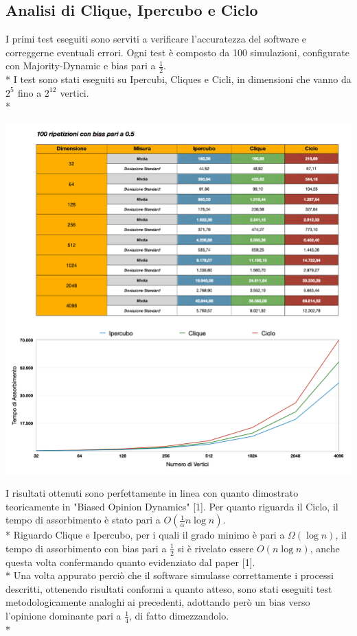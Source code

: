 \documentclass{article}
\begin{document}
\subsection{Analisi di Clique, Ipercubo e Ciclo}
I primi test eseguiti sono serviti a verificare l'accuratezza del software e correggerne eventuali errori. Ogni test è composto da 100 simulazioni, configurate con Majority-Dynamic e bias pari a $\frac{1}{2}$.\\*
I test sono stati eseguiti su Ipercubi, Cliques e Cicli, in dimensioni che vanno da $2^{5^{\mathrm{}}}$ fino a $2^{12^{\mathrm{}}}$ vertici.\\*
\begin{center}
\includegraphics[width=1\textwidth]{Test/test_bias05.png}
\end{center}
I risultati ottenuti sono perfettamente in linea con quanto dimostrato teoricamente in  "Biased Opinion Dynamics" [1]. Per quanto riguarda il Ciclo, il tempo di assorbimento è stato pari a $O(\frac{1}{\alpha}n\log{}n)$. \\*
Riguardo Clique e Ipercubo, per i quali il grado minimo è pari a $\Omega(\log{}n)$, il tempo di assorbimento con bias pari a $\frac{1}{2}$ si è rivelato essere $O(n\log{}n)$, anche questa volta confermando quanto evidenziato dal paper [1].\\*
Una volta appurato perciò che il software simulasse correttamente i processi descritti, ottenendo risultati conformi a quanto atteso, sono stati eseguiti test metodologicamente analoghi ai precedenti, adottando però un bias verso l'opinione dominante pari a $\frac{1}{4}$, di fatto dimezzandolo.\\*
\end{document}

